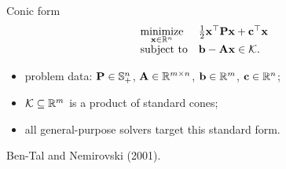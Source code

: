 \documentclass[10pt,mathserif,aspectratio=169]{beamer}
\newcommand{\bul}{\setlength\itemsep{1.1ex}}
\begin{document}
\begin{frame}{Conic form}
\vspace{-1ex}
\[
  \begin{array}{ll}
    \underset{\mathbf{x} \in \mathbb{R}^n}{\mbox{minimize}}
      & \frac{1}{2}\mathbf{x}^\top \mathbf{P} \mathbf{x} + \mathbf{c}^\top \mathbf{x} \\[0.6ex]
    \mbox{subject to} & \mathbf{b} - \mathbf{A}\mathbf{x} \in \mathcal{K}.
  \end{array}
\]

\vspace{1ex}
\begin{itemize}\small\bul
  \item problem data: $\mathbf{P} \in \mathbb{S}^n_+$,
        $\mathbf{A} \in \mathbb{R}^{m \times n}$, $\mathbf{b} \in \mathbb{R}^m$, $\mathbf{c} \in \mathbb{R}^n$;
  \item $\mathcal{K} \subseteq \mathbb{R}^m$ is a product of standard cones;
  \item all general-purpose solvers target this standard form.
\end{itemize}

\vfill
{\scriptsize\color{black!55} Ben-Tal and Nemirovski (2001).}
\end{frame}
\end{document}
